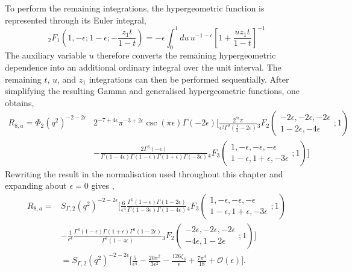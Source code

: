 To perform the remaining integrations, the hypergeometric function is represented through its
Euler integral,
\begin{equation}
    {}_2F_1\!\left(1,-\epsilon;1-\epsilon;-\frac{z_1t}{1-t}\right) = -\epsilon\int_0^1 du\,u^{-1-\epsilon}\!\left[1+\frac{uz_1t}{1-t}\right]^{-1}
\end{equation}
The auxiliary variable $u$ therefore converts the remaining hypergeometric dependence into an
additional ordinary integral over the unit interval. The remaining $t$, $u$, and $z_1$
integrations can then be performed sequentially. After simplifying the resulting Gamma and
generalised hypergeometric functions, one obtains,
\begin{equation}
    \begin{split}
        R_{8,a} = \Phi_2\!\left(q^2\right)^{-2-2\epsilon}&2^{-7+4\epsilon}\pi^{-3+2\epsilon}\csc(\pi\epsilon)\Gamma(-2\epsilon)\Bigg[\frac{2^{8\epsilon}\pi}{\epsilon^2\Gamma^2\!\left(\frac12-2\epsilon\right)}{}_3F_2\!\left(\begin{array}{c} -2\epsilon, -2\epsilon, -2\epsilon \\ 1-2\epsilon, -4\epsilon \end{array};1\right)\\
                                                      &-\frac{2\Gamma^3(-\epsilon)}{\Gamma(1-4\epsilon)\Gamma(1-\epsilon)\Gamma(1+\epsilon)\Gamma(-3\epsilon)}{}_4F_3\!\left(\begin{array}{c} 1, -\epsilon, -\epsilon, -\epsilon \\ 1-\epsilon, 1+\epsilon, -3\epsilon \end{array};1\right)\Bigg]
    \end{split}
\end{equation}
Rewriting the result in the normalisation used throughout this chapter and expanding about
$\epsilon=0$ gives \cite{GehrmannDeRidder0311276,TM_JoanaReis}, 
\begin{equation}
    \begin{split}
        R_{8,a} = &S_{\Gamma,2}\!\left(q^2\right)^{-2-2\epsilon}\Bigg[\frac6{\epsilon^4}\frac{\Gamma^5(1-\epsilon)\Gamma(1-2\epsilon)}{\Gamma(1-3\epsilon)\Gamma(1-4\epsilon)}{}_4F_3\!\left(\begin{array}{c} 1, -\epsilon, -\epsilon, -\epsilon \\ 1-\epsilon, 1+\epsilon, -3\epsilon \end{array};1\right)\\
                  &-\frac1{\epsilon^4}\frac{\Gamma^3(1-\epsilon)\Gamma(1+\epsilon)\Gamma^3(1-2\epsilon)}{\Gamma^2(1-4\epsilon)}{}_3F_2\!\left(\begin{array}{c} -2\epsilon, -2\epsilon, -2\epsilon \\ -4\epsilon, 1-2\epsilon \end{array};1\right)\Bigg]\\
                  &=S_{\Gamma,2}\!\left(q^2\right)^{-2-2\epsilon}\Bigg[\frac5{\epsilon^4}-\frac{20\pi^2}{3\epsilon^2}-\frac{126\zeta_3}{\epsilon}+\frac{7\pi^4}{18}+\mathcal O(\epsilon)\Bigg].
    \end{split}
\end{equation}

